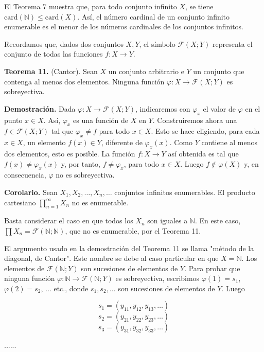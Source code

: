 El Teorema 7 muestra que, para todo conjunto infinito \( X \), se tiene \( \text{card}(\mathbb{N}) \leq \text{card}(X) \). Así, el número cardinal de un conjunto infinito enumerable es el menor de los números cardinales de los conjuntos infinitos.

Recordamos que, dados dos conjuntos \( X, Y \), el símbolo \( \mathcal{F}(X; Y) \) representa el conjunto de todas las funciones \( f: X \to Y \).

\textbf{Teorema 11.} (Cantor). Sean \( X \) un conjunto arbitrario e \( Y \) un conjunto que contenga al menos dos elementos. Ninguna función \( \varphi: X \to \mathcal{F}(X; Y) \) es sobreyectiva.

\textbf{Demostración.} Dada \( \varphi: X \to \mathcal{F}(X; Y) \), indicaremos con \( \varphi_x \) el valor de \( \varphi \) en el punto \( x \in X \). Así, \( \varphi_x \) es una función de \( X \) en \( Y \). Construiremos ahora una \( f \in \mathcal{F}(X; Y) \) tal que \( \varphi_x \neq f \) para todo \( x \in X \). Esto se hace eligiendo, para cada \( x \in X \), un elemento \( f(x) \in Y \), diferente de \( \varphi_x(x) \). Como \( Y \) contiene al menos dos elementos, esto es posible. La función \( f: X \to Y \) así obtenida es tal que \( f(x) \neq \varphi_x(x) \) y, por tanto, \( f \neq \varphi_x \), para todo \( x \in X \). Luego \( f \notin \varphi(X) \) y, en consecuencia, \( \varphi \) no es sobreyectiva.

\textbf{Corolario.} Sean \( X_1, X_2, \ldots, X_n, \ldots \) conjuntos infinitos enumerables. El producto cartesiano \( \prod_{n=1}^{\infty} X_n \) no es enumerable.

Basta considerar el caso en que todos los \( X_n \) son iguales a \( \mathbb{N} \). En este caso, \( \prod X_n = \mathcal{F}(\mathbb{N}; \mathbb{N}) \), que no es enumerable, por el Teorema 11.

El argumento usado en la demostración del Teorema 11 se llama "método de la diagonal, de Cantor". Este nombre se debe al caso particular en que \( X = \mathbb{N} \). Los elementos de \( \mathcal{F}(\mathbb{N}; Y) \) son sucesiones de elementos de \( Y \). Para probar que ninguna función \( \varphi : \mathbb{N} \to \mathcal{F}(\mathbb{N}; Y) \) es sobreyectiva, escribimos \( \varphi(1) = s_1 \), \( \varphi(2) = s_2 \), ... etc., donde \( s_1, s_2, \ldots \) son sucesiones de elementos de \( Y \). Luego

\[
s_1 = (y_{11}, y_{12}, y_{13}, \ldots)
\]
\[
s_2 = (y_{21}, y_{22}, y_{23}, \ldots)
\]
\[
s_3 = (y_{31}, y_{32}, y_{33}, \ldots)
\]
\begin{center}
    ......
\end{center}

